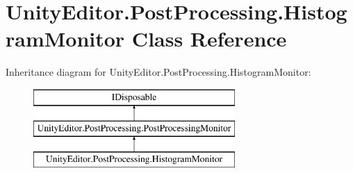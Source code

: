 \hypertarget{class_unity_editor_1_1_post_processing_1_1_histogram_monitor}{}\section{Unity\+Editor.\+Post\+Processing.\+Histogram\+Monitor Class Reference}
\label{class_unity_editor_1_1_post_processing_1_1_histogram_monitor}
Inheritance diagram for Unity\+Editor.\+Post\+Processing.\+Histogram\+Monitor\+:\begin{figure}[H]
\begin{center}
\leavevmode
\includegraphics[height=3.000000cm]{class_unity_editor_1_1_post_processing_1_1_histogram_monitor}
\end{center}
\end{figure}
